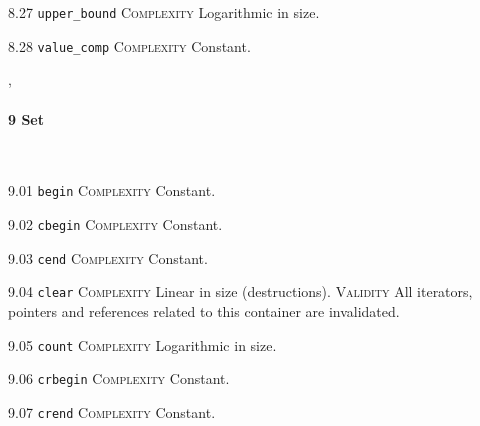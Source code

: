 \noindent\textcolor{clime}{8.27 \texttt{upper\_bound}} \textsc{Complexity} Logarithmic in size. \vspace{0.5em}

\noindent\textcolor{cgreen}{8.28 \texttt{value\_comp}} \textsc{Complexity} Constant. \vspace{0.5em}


\sep
{}
\paragraph{9 Set}\mbox{}\\
\noindent\textcolor{cgreen}{9.01 \texttt{begin}} \textsc{Complexity} Constant. \vspace{0.5em}

\noindent\textcolor{cgreen}{9.02 \texttt{cbegin}} \textsc{Complexity} Constant. \vspace{0.5em}

\noindent\textcolor{cgreen}{9.03 \texttt{cend}} \textsc{Complexity} Constant. \vspace{0.5em}

\noindent\textcolor{corange}{9.04 \texttt{clear}} \textsc{Complexity} Linear in size (destructions). \textsc{Validity} All iterators, pointers and references related to this container are invalidated.\vspace{0.5em}

\noindent\textcolor{clime}{9.05 \texttt{count}} \textsc{Complexity} Logarithmic in size. \vspace{0.5em}

\noindent\textcolor{cgreen}{9.06 \texttt{crbegin}} \textsc{Complexity} Constant. \vspace{0.5em}

\noindent\textcolor{cgreen}{9.07 \texttt{crend}} \textsc{Complexity} Constant. \vspace{0.5em}

